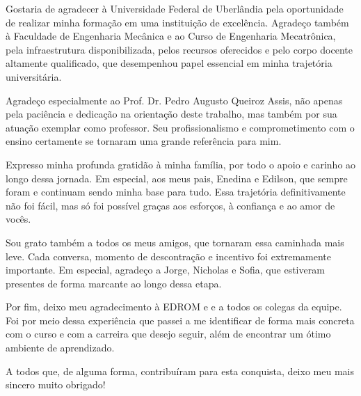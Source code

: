 \documentclass[12pt, %
openright, 
oneside, %
a4paper,    %
brazil]{facom-ufu-abntex2}
\begin{document}


\begin{agradecimentos}
Gostaria de agradecer à Universidade Federal de Uberlândia pela oportunidade de realizar minha formação em uma instituição de excelência. Agradeço também à Faculdade de Engenharia Mecânica e ao Curso de Engenharia Mecatrônica, pela infraestrutura disponibilizada, pelos recursos oferecidos e pelo corpo docente altamente qualificado, que desempenhou papel essencial em minha trajetória universitária. 

Agradeço especialmente ao Prof. Dr. Pedro Augusto Queiroz Assis, não apenas pela paciência e dedicação na orientação deste trabalho, mas também por sua atuação exemplar como professor. Seu profissionalismo e comprometimento com o ensino certamente se tornaram uma grande referência para mim.

Expresso minha profunda gratidão à minha família, por todo o apoio e carinho ao longo dessa jornada. Em especial, aos meus pais, Enedina e Edilson, que sempre foram e continuam sendo minha base para tudo. Essa trajetória definitivamente não foi fácil, mas só foi possível graças aos esforços, à confiança e ao amor de vocês.

Sou grato também a todos os meus amigos, que tornaram essa caminhada mais leve. Cada conversa, momento de descontração e incentivo foi extremamente importante. Em especial, agradeço a Jorge, Nicholas e Sofia, que estiveram presentes de forma marcante ao longo dessa etapa.

Por fim, deixo meu agradecimento à EDROM e e a todos os colegas da equipe. Foi por meio dessa experiência que passei a me identificar de forma mais concreta com o curso e com a carreira que desejo seguir, além de encontrar um ótimo ambiente de aprendizado.

A todos que, de alguma forma, contribuíram para esta conquista, deixo meu mais sincero muito obrigado!

\end{agradecimentos}

\end{document}
